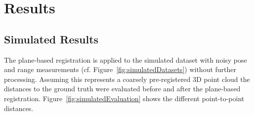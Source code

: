 \section{Results}

\subsection{Simulated Results}

The plane-based registration is applied to the simulated dataset with noisy pose and range measurements (cf. Figure~\ref{fig:simulatedDatasets}) without further processing.
Assuming this represents a coarsely pre-registered 3D point cloud the distances to the ground truth were evaluated before and after the plane-based registration. 
Figure~\ref{fig:simulatedEvaluation} shows the different point-to-point distances. 

